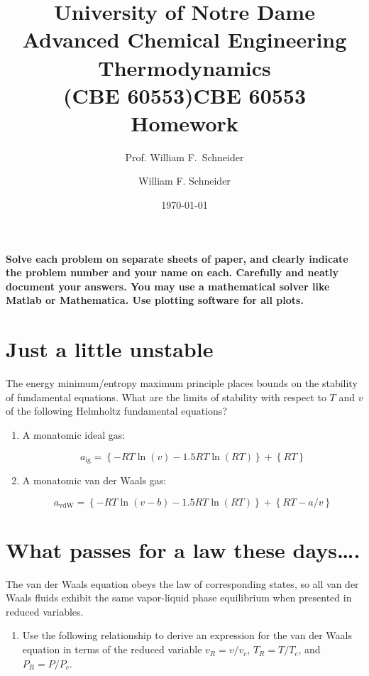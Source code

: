 \documentclass[11pt]{article}
\title{University of Notre Dame\\Advanced Chemical Engineering Thermodynamics\\(CBE 60553)}
\author{Prof. William F.\ Schneider}
\author{William F. Schneider}
\date{\today}
\title{CBE 60553 Homework}
\begin{document}
\begin{OPTIONS}
\end{OPTIONS}

\noindent \textbf{Solve each problem on separate sheets of paper, and clearly indicate the problem number and your name on each.  Carefully and neatly document your answers.  You may use a mathematical solver like Matlab or Mathematica. Use plotting software for all plots.}

\section{Just a little unstable}
\label{sec:org5d4dcbe}
The energy minimum/entropy maximum principle places bounds on the stability of fundamental equations.  What are the limits of stability with respect to \(T\) and \(v\) of the following Helmholtz fundamental equations?

\begin{enumerate}
\item A monatomic ideal gas:

\begin{equation*}
 a_\text{ig} = \left \{ - RT \ln (v) -1.5 R T \ln (R T) \right\} +\left \{ RT \right \}
\end{equation*}

\item A monatomic van der Waals gas:

\begin{equation*}
  a_\text{vdW} = \left \{ - RT \ln (v-b) -1.5 R T \ln (R T) \right\} +\left \{ RT -a/v
  \right \}
  \end{equation*}
\end{enumerate}

\section{What passes for a law these days\ldots{}.}
\label{sec:orgbf90451}
The van der Waals equation obeys
  the law of corresponding states, so all van der Waals fluids exhibit the same
  vapor-liquid phase equilibrium when presented in reduced variables.

\begin{enumerate}
\item Use the following relationship to derive an expression for the van der Waals
equation in terms of the reduced variable \(v_R = v/v_c\), \(T_R = T/T_c\), and
\(P_R = P/P_c\).
\end{enumerate}
\end{document}

